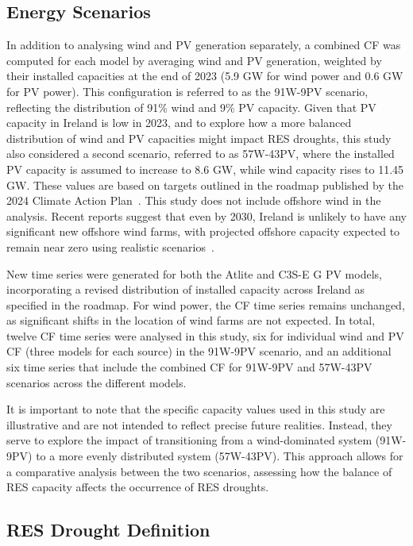 \documentclass[preprint, 12pt, authoryear]{elsarticle}
\begin{document}
\subsection{Energy Scenarios}
\label{sec:scenarios}

In addition to analysing wind and PV generation separately, a combined CF was computed for each model by averaging wind and PV generation, weighted by their installed capacities at the end of 2023 (5.9 GW for wind power and 0.6 GW for PV power). This configuration is referred to as the 91W-9PV scenario, reflecting the distribution of 91\% wind and 9\% PV capacity. Given that PV capacity in Ireland is low in 2023, and to explore how a more balanced distribution of wind and PV capacities might impact RES droughts, this study also considered a second scenario, referred to as 57W-43PV, where the installed PV capacity is assumed to increase to 8.6 GW, while wind capacity rises to 11.45 GW. These values are based on targets outlined in the roadmap published by the 2024 Climate Action Plan~\citep{cap2024future}. This study does not include offshore wind in the analysis. Recent reports suggest that even by 2030, Ireland is unlikely to have any significant new offshore wind farms, with projected offshore capacity expected to remain near zero using realistic scenarios~\citep{seai2024future}.

New time series were generated for both the Atlite and C3S-E G PV models, incorporating a revised distribution of installed capacity across Ireland as specified in the roadmap. For wind power, the CF time series remains unchanged, as significant shifts in the location of wind farms are not expected. In total, twelve CF time series were analysed in this study, six for individual wind and PV CF (three models for each source) in the 91W-9PV scenario, and an additional six time series that include the combined CF for 91W-9PV and 57W-43PV scenarios across the different models.

It is important to note that the specific capacity values used in this study are illustrative and are not intended to reflect precise future realities. Instead, they serve to explore the impact of transitioning from a wind-dominated system (91W-9PV) to a more evenly distributed system (57W-43PV). This approach allows for a comparative analysis between the two scenarios, assessing how the balance of RES capacity affects the occurrence of RES droughts.

\subsection{RES Drought Definition}
\label{sec:res_drought}
\end{document}
